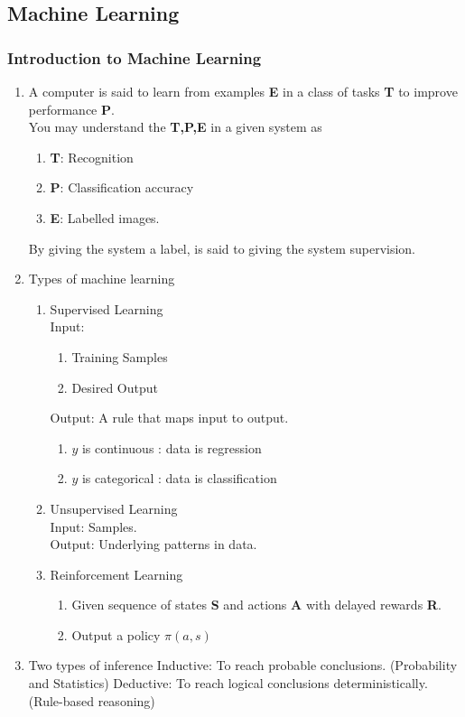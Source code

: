 \subsection{Machine Learning}
\subsubsection{Introduction to Machine Learning}
\begin{enumerate}
    \item A computer is said to learn from examples \textbf{E} in a class of tasks \textbf{T} to improve performance \textbf{P}.\\
        You may understand the \textbf{T,P,E} in a given system as
        \begin{enumerate}
            \item \textbf{T}: Recognition
            \item \textbf{P}: Classification accuracy
            \item \textbf{E}: Labelled images.
        \end{enumerate}
        By giving the system a label, is said to giving the system supervision.
    \item Types of machine learning
    \begin{enumerate}
        \item Supervised Learning \\
        Input:
        \begin{enumerate}
            \item Training Samples
            \item Desired Output
        \end{enumerate}
        Output: A rule that maps input to output.
        \begin{enumerate}
            \item $y$ is continuous : data is regression
            \item $y$ is categorical : data is classification
        \end{enumerate}
        \item Unsupervised Learning \\
        Input: Samples. \\
        Output: Underlying patterns in data.
        \item Reinforcement Learning
        \begin{enumerate}
            \item Given sequence of states \textbf{S} and actions \textbf{A} with delayed rewards \textbf{R}.
            \item Output a policy $\pi(a,s)$
        \end{enumerate}
    \end{enumerate}
    \item Two types of inference
    Inductive: To reach probable conclusions. (Probability and Statistics)
    Deductive: To reach logical conclusions deterministically. (Rule-based reasoning)
\end{enumerate}
